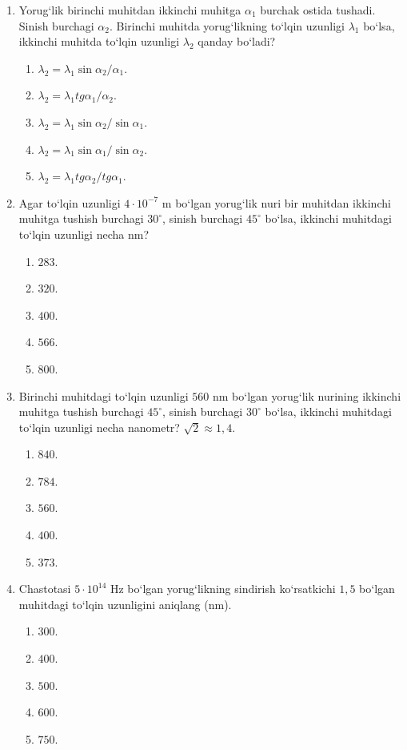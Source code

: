 \begin{enumerate}
\item Yorug‘lik birinchi muhitdan ikkinchi muhitga $\alpha_1$ burchak ostida tushadi. Sinish burchagi $\alpha_2$. Birinchi muhitda yorug‘likning to‘lqin uzunligi $\lambda_1$ bo‘lsa, ikkinchi muhitda to‘lqin uzunligi $\lambda_2$ qanday bo‘ladi?
\begin{enumerate}[label=\Alph*)]
\item $\lambda_2=\lambda_1\sin\alpha_2/\alpha_1$.
\item $\lambda_2=\lambda_1 tg\alpha_1/\alpha_2$.
\item $\lambda_2=\lambda_1\sin\alpha_2/\sin\alpha_1$.
\item $\lambda_2=\lambda_1\sin\alpha_1/\sin\alpha_2$.
\item $\lambda_2=\lambda_1 tg\alpha_2/ tg\alpha_1$.
\end{enumerate}


\item Agar to‘lqin uzunligi $4\cdot10^{-7}$ m bo‘lgan yorug‘lik nuri bir muhitdan ikkinchi muhitga tushish burchagi $30^\circ$, sinish burchagi $45^\circ$ bo‘lsa, ikkinchi muhitdagi to‘lqin uzunligi necha nm?
\begin{enumerate}[label=\Alph*)]
\item $283$.
\item $320$.
\item $400$.
\item $566$.
\item $800$.
\end{enumerate}

\item Birinchi muhitdagi to‘lqin uzunligi $560$ nm bo‘lgan yorug‘lik nurining ikkinchi muhitga tushish burchagi $45^\circ$, sinish burchagi $30^\circ$ bo‘lsa, ikkinchi muhitdagi to‘lqin uzunligi necha nanometr? $\sqrt{2}\approx1{,}4$.
\begin{enumerate}[label=\Alph*)]
\item $840$.
\item $784$.
\item $560$.
\item $400$.
\item $373$.
\end{enumerate}

\item Chastotasi $5\cdot10^{14}$ Hz bo‘lgan yorug‘likning sindirish ko‘rsatkichi $1,5$ bo‘lgan muhitdagi to‘lqin uzunligini aniqlang (nm).
\begin{enumerate}[label=\Alph*)]
\item $300$.
\item $400$.
\item $500$.
\item $600$.
\item $750$.
\end{enumerate}


\end{enumerate}

